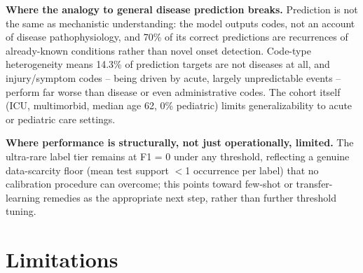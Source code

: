 \documentclass[11pt]{article}
\begin{document}
\textbf{Where the analogy to general disease prediction breaks.} Prediction
is not the same as mechanistic understanding: the model outputs codes, not an
account of disease pathophysiology, and 70\% of its correct predictions are
recurrences of already-known conditions rather than novel onset detection.
Code-type heterogeneity means 14.3\% of prediction targets are not diseases
at all, and injury/symptom codes -- being driven by acute, largely
unpredictable events -- perform far worse than disease or even administrative
codes. The cohort itself (ICU, multimorbid, median age 62, 0\% pediatric)
limits generalizability to acute or pediatric care settings.

\textbf{Where performance is structurally, not just operationally, limited.}
The ultra-rare label tier remains at F1 = 0 under any threshold, reflecting a
genuine data-scarcity floor (mean test support $<$1 occurrence per label) that
no calibration procedure can overcome; this points toward few-shot or
transfer-learning remedies as the appropriate next step, rather than further
threshold tuning.

\section{Limitations}
\end{document}
